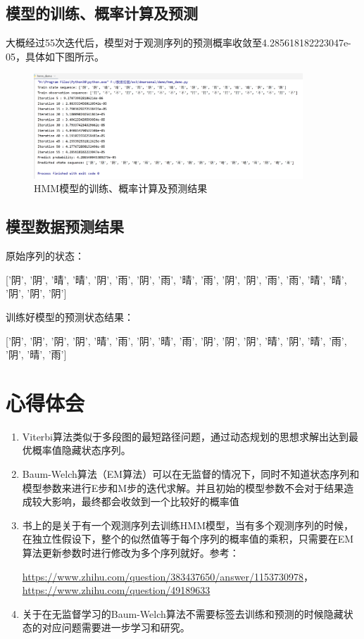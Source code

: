 \documentclass[12pt,AutoFakeBold,a4paper]{article}
\begin{document}
\subsection{模型的训练、概率计算及预测}
大概经过55次迭代后，模型对于观测序列的预测概率收敛至4.285618182223047e-05，具体如下图所示。
\begin{figure}[H]
\centering
\includegraphics[width=0.9\textwidth]{figures/hmm_output.png}
\caption{HMM模型的训练、概率计算及预测结果}
\label{fig:out}
\end{figure}
\subsection{模型数据预测结果}
原始序列的状态：

['阴', '阴', '晴', '晴', '阴', '雨', '阴', '雨', '晴', '雨', '阴', '阴', '雨', '雨', '晴', '晴', '阴', '阴', '阴']
\newline

训练好模型的预测状态结果：

['阴', '阴', '阴', '阴', '晴', '雨', '阴', '晴', '雨', '阴', '阴', '阴', '晴', '阴', '晴', '雨', '阴', '晴', '雨']

\section{心得体会}
\begin{enumerate}

\item Viterbi算法类似于多段图的最短路径问题，通过动态规划的思想求解出达到最优概率值隐藏状态序列。

\item Baum-Welch算法（EM算法）可以在无监督的情况下，同时不知道状态序列和模型参数来进行E步和M步的迭代求解。并且初始的模型参数不会对于结果造成较大影响，最终都会收敛到一个比较好的概率值

\item 书上的是关于有一个观测序列去训练HMM模型，当有多个观测序列的时候，在独立性假设下，整个的似然值等于每个序列的概率值的乘积，只需要在EM算法更新参数时进行修改为多个序列就好。参考： 

\href{https://www.zhihu.com/question/383437650/answer/1153730978}{https://www.zhihu.com/question/383437650/answer/1153730978}，\href{https://www.zhihu.com/question/49189633}{https://www.zhihu.com/question/49189633}

\item 关于在无监督学习的Baum-Welch算法不需要标签去训练和预测的时候隐藏状态的对应问题需要进一步学习和研究。

 
\end{enumerate}
\end{document}
